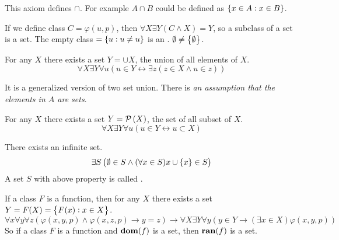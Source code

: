 This axiom defines $\cap$. For example $A \cap B$ could be defined as $\set{x \in A: x \in B}$.


If we define class $C = \varphi(u, p)$, then $\forall X \exists Y (C \wedge X )= Y$, so a subclass of a set is a set. The empty class \cindex{$\emptyset$} $ = \set{u: u \neq u} $ is an . $\emptyset \neq \set{\emptyset}$.

\begin{axiom}
    For any $X$ there exists a set $Y = \cup X$, the union of all elements of $X$.
    \begin{equation}
        \forall X \exists Y \forall u \left(u \in Y \leftrightarrow \exists z (z \in X \wedge u \in z ) \right)
    \end{equation}
    
    It is a generalized version of two set union. There is \emph{an assumption that the elements in $A$ are sets}.
\end{axiom}

\begin{axiom}
    For any $X$ there exists a set $Y = \mathcal{P}\left( X \right)$, the set of all subset of $X$.
    \begin{equation}
        \forall X \exists Y \forall u (u \in Y \leftrightarrow u \subset X )
    \end{equation}
\end{axiom}

\begin{axiom}
    There exists an infinite set.
    \begin{equation}
        \exists S \left( \emptyset \in S \wedge (\forall x \in S ) x \cup \set{x} \in S \right)
    \end{equation}
    A set $S$ with above property is called .
\end{axiom}

\begin{axiom}
    If a class $F$ is a function, then for any $X$ there exists a set $Y = F(X) = \set{F(x): x \in X}$.
    \begin{equation}
        \forall x \forall y \forall z \left( \varphi(x,y,p) \wedge \varphi(x,z,p) \rightarrow y = z \right) \rightarrow \forall X \exists Y \forall y \left( y \in Y \rightarrow (\exists x \in X ) \varphi(x,y,p) \right)
    \end{equation}
    So if a class $F$ is a function and $\mathbf{dom}(f)$ is a set, then $\mathbf{ran}(f)$ is a set.
\end{axiom}


